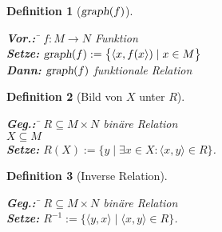 \documentclass{article}
\def\pair(#1,#2){\langle #1, #2 \rangle}
\newtheorem{Definition}{Definition}
\begin{document}
\begin{Definition}[$\textsl{graph}(f)$] \hspace*{\fill} \\[-0.5cm]
  \begin{tabbing}
    \textbf{Vor.:} \quad \=  $f:M \rightarrow N$ \quad Funktion \\[0.1cm]
    \textbf{Setze:} \>  $\textsl{graph}(f) := \bigl\{ \pair(x,f(x)) \mid  x\in M \bigr\}$   \\[0.1cm]
    \textbf{Dann:}  \>  $\textsl{graph}(f)$ funktionale Relation
  \end{tabbing}
\end{Definition}

\begin{Definition}[Bild von $X$ unter $R$] \hspace*{\fill} \\[-0.5cm]
  \begin{tabbing}
    \textbf{Geg.:}  \quad \= $R \subseteq M \times N$ bin\"{a}re Relation \\[0.1cm]
                    \>  $X \subseteq M$                               \\[0.1cm]
    \textbf{Setze:} \>  $R(X) := \{ y \mid \exists x \in X \colon \pair(x,y) \in R \}$. 
  \end{tabbing}
\end{Definition}

\begin{Definition}[Inverse Relation] \hspace*{\fill} \\[-0.5cm]
  \begin{tabbing}
    \textbf{Geg.:} \quad \=  $R \subseteq M \times N$ bin\"{a}re Relation \\[0.1cm]
    \textbf{Setze:} \> $R^{-1} := \bigl\{ \pair(y,x) \mid \pair(x,y) \in R  \bigr\}$. \\[0.1cm]
  \end{tabbing}
\end{Definition}
\end{document}
